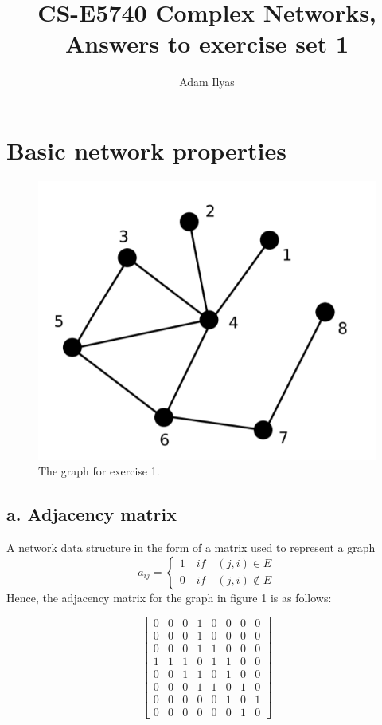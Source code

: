 \documentclass[a4paper,12pt]{article}
\author{Adam Ilyas}
\title{
CS-E5740 Complex Networks, \\
Answers to exercise set 1
}
\begin{document}
\vspace{8pt}

\maketitle

\section{Basic network properties}

\begin{figure}[!ht]
	\begin{center}
    \includegraphics[scale=0.33]{graph_ex_1.png}
    \caption{The graph for exercise 1.}
	\label{fig:graph1}
	\end{center}
\end{figure}

\subsection*{a. Adjacency matrix}
A network data structure in the form of a matrix used to represent a
graph
\[
  a_{ij}=\begin{cases}
               1 \quad if \quad (j,i) \in E\\
               0 \quad if \quad (j,i) \notin E
            \end{cases}
\]
Hence, the adjacency matrix for the graph in figure 1 is as follows:

	$$
	\begin{bmatrix} 
		0&0&0&1&0&0&0&0\\
		0&0&0&1&0&0&0&0\\
		0&0&0&1&1&0&0&0\\
		1&1&1&0&1&1&0&0\\
		0&0&1&1&0&1&0&0\\
		0&0&0&1&1&0&1&0\\
		0&0&0&0&0&1&0&1\\
		0&0&0&0&0&0&1&0
	\end{bmatrix}$$
\end{document}
